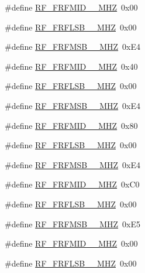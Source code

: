 \begin{DoxyCompactItemize}
\item 
\#define \mbox{\hyperlink{sx1276_regs-_fsk_8h_ad0aa8be155a01fea5b88cf0f0973f93b}{R\+F\+\_\+\+F\+R\+F\+M\+I\+D\+\_\+\_\+\+M\+HZ}}~0x00
\item 
\#define \mbox{\hyperlink{sx1276_regs-_fsk_8h_a0a5d15119dbdf4aefbc6c11d65c2b360}{R\+F\+\_\+\+F\+R\+F\+L\+S\+B\+\_\+\_\+\+M\+HZ}}~0x00
\item 
\#define \mbox{\hyperlink{sx1276_regs-_fsk_8h_aed868e22bd165fab920c66816c665033}{R\+F\+\_\+\+F\+R\+F\+M\+S\+B\+\_\+\_\+\+M\+HZ}}~0x\+E4
\item 
\#define \mbox{\hyperlink{sx1276_regs-_fsk_8h_aa6875f66924d31b915390903c1fab25a}{R\+F\+\_\+\+F\+R\+F\+M\+I\+D\+\_\+\_\+\+M\+HZ}}~0x40
\item 
\#define \mbox{\hyperlink{sx1276_regs-_fsk_8h_a007ff670a860ed0968e2022a303bcaf5}{R\+F\+\_\+\+F\+R\+F\+L\+S\+B\+\_\+\_\+\+M\+HZ}}~0x00
\item 
\#define \mbox{\hyperlink{sx1276_regs-_fsk_8h_a9ec17583ae6938b5f9a1cdaadc5376b2}{R\+F\+\_\+\+F\+R\+F\+M\+S\+B\+\_\+\_\+\+M\+HZ}}~0x\+E4
\item 
\#define \mbox{\hyperlink{sx1276_regs-_fsk_8h_adbcd8c0ac344d059c366381b5c72c058}{R\+F\+\_\+\+F\+R\+F\+M\+I\+D\+\_\+\_\+\+M\+HZ}}~0x80
\item 
\#define \mbox{\hyperlink{sx1276_regs-_fsk_8h_addbb5e073b3813270c984ef1413be95b}{R\+F\+\_\+\+F\+R\+F\+L\+S\+B\+\_\+\_\+\+M\+HZ}}~0x00
\item 
\#define \mbox{\hyperlink{sx1276_regs-_fsk_8h_ad149370afbff5b09fdf963efb76142fb}{R\+F\+\_\+\+F\+R\+F\+M\+S\+B\+\_\+\_\+\+M\+HZ}}~0x\+E4
\item 
\#define \mbox{\hyperlink{sx1276_regs-_fsk_8h_ace60596f70acafb3b57d31bc658e484e}{R\+F\+\_\+\+F\+R\+F\+M\+I\+D\+\_\+\_\+\+M\+HZ}}~0x\+C0
\item 
\#define \mbox{\hyperlink{sx1276_regs-_fsk_8h_a18c46e7d8870d1d8c0a82b8f67be4d5a}{R\+F\+\_\+\+F\+R\+F\+L\+S\+B\+\_\+\_\+\+M\+HZ}}~0x00
\item 
\#define \mbox{\hyperlink{sx1276_regs-_fsk_8h_ad7c62f39d583a8fcd4c15374d8bee1f6}{R\+F\+\_\+\+F\+R\+F\+M\+S\+B\+\_\+\_\+\+M\+HZ}}~0x\+E5
\item 
\#define \mbox{\hyperlink{sx1276_regs-_fsk_8h_af4f0e5b8ac05cd73f32e19dd96ae34cf}{R\+F\+\_\+\+F\+R\+F\+M\+I\+D\+\_\+\_\+\+M\+HZ}}~0x00
\item 
\#define \mbox{\hyperlink{sx1276_regs-_fsk_8h_a806e977236285fcd65eb5c5028a165e5}{R\+F\+\_\+\+F\+R\+F\+L\+S\+B\+\_\+\_\+\+M\+HZ}}~0x00

\end{DoxyCompactItemize}
